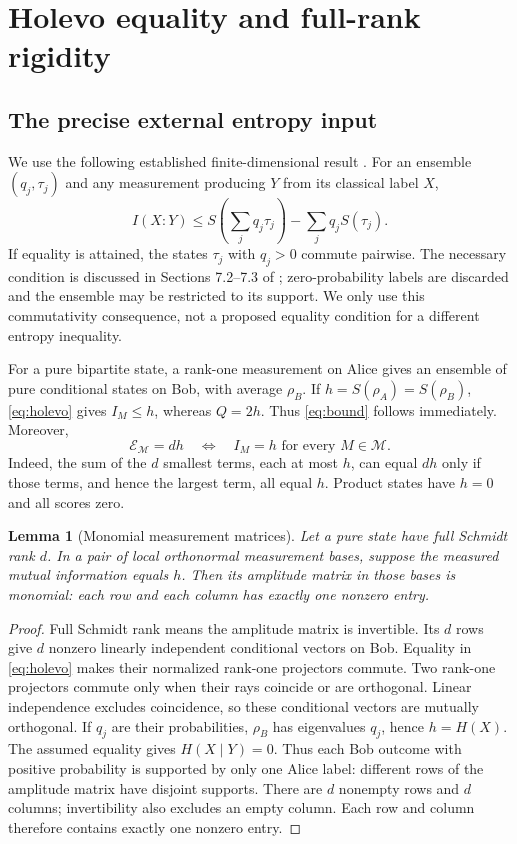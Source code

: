 \documentclass[11pt]{article}
\newtheorem{lemma}[theorem]{Lemma}
\theoremstyle{remark}\newtheorem{remark}[theorem]{Remark}
\newcommand{\M}{\mathcal M}
\newcommand{\E}{\mathcal E}
\begin{document}
\section{Holevo equality and full-rank rigidity}
\subsection{The precise external entropy input}
We use the following established finite-dimensional result \cite{holevo,ruskai}. For an ensemble $(q_j,\tau_j)$ and any measurement producing $Y$ from its classical label $X$,
\begin{equation}\label{eq:holevo}
 I(X:Y)\le S\left(\sum_jq_j\tau_j\right)-\sum_jq_jS(\tau_j).
\end{equation}
If equality is attained, the states $\tau_j$ with $q_j>0$ commute pairwise. The necessary condition is discussed in Sections 7.2--7.3 of \cite{ruskai}; zero-probability labels are discarded and the ensemble may be restricted to its support. We only use this commutativity consequence, not a proposed equality condition for a different entropy inequality.

For a pure bipartite state, a rank-one measurement on Alice gives an ensemble of pure conditional states on Bob, with average $\rho_B$. If $h=S(\rho_A)=S(\rho_B)$, \eqref{eq:holevo} gives $I_M\le h$, whereas $Q=2h$. Thus \eqref{eq:bound} follows immediately. Moreover,
\begin{equation}\label{eq:all-equal}
 \E_\M=d h\quad\Longleftrightarrow\quad I_M=h\text{ for every }M\in\M.
\end{equation}
Indeed, the sum of the $d$ smallest terms, each at most $h$, can equal $dh$ only if those terms, and hence the largest term, all equal $h$. Product states have $h=0$ and all scores zero.

\begin{lemma}[Monomial measurement matrices]\label{lem:monomial}
Let a pure state have full Schmidt rank $d$. In a pair of local orthonormal measurement bases, suppose the measured mutual information equals $h$. Then its amplitude matrix in those bases is monomial: each row and each column has exactly one nonzero entry.
\end{lemma}
\begin{proof}
Full Schmidt rank means the amplitude matrix is invertible. Its $d$ rows give $d$ nonzero linearly independent conditional vectors on Bob. Equality in \eqref{eq:holevo} makes their normalized rank-one projectors commute. Two rank-one projectors commute only when their rays coincide or are orthogonal. Linear independence excludes coincidence, so these conditional vectors are mutually orthogonal. If $q_j$ are their probabilities, $\rho_B$ has eigenvalues $q_j$, hence $h=H(X)$. The assumed equality gives $H(X\mid Y)=0$. Thus each Bob outcome with positive probability is supported by only one Alice label: different rows of the amplitude matrix have disjoint supports. There are $d$ nonempty rows and $d$ columns; invertibility also excludes an empty column. Each row and column therefore contains exactly one nonzero entry.
\end{proof}
\end{document}
